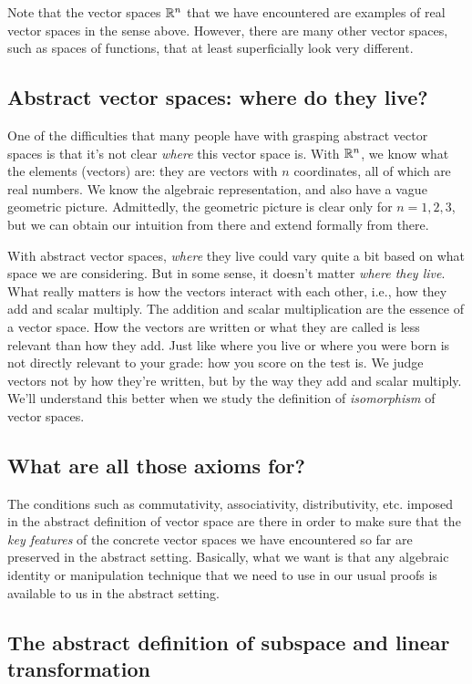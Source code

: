 \documentclass[10pt]{amsart}
\begin{document}
Note that the vector spaces $\mathbb{R}^n$ that we have encountered are
examples of real vector spaces in the sense above. However, there are
many other vector spaces, such as spaces of functions, that at least
superficially look very different.

\subsection{Abstract vector spaces: where do they live?}

One of the difficulties that many people have with grasping abstract
vector spaces is that it's not clear {\em where} this vector space
is. With $\mathbb{R}^n$, we know what the elements (vectors) are: they are
vectors with $n$ coordinates, all of which are real numbers. We know
the algebraic representation, and also have a vague geometric
picture. Admittedly, the geometric picture is clear only for $n =
1,2,3$, but we can obtain our intuition from there and extend formally
from there.

With abstract vector spaces, {\em where} they live could vary quite a
bit based on what space we are considering. But in some sense, it
doesn't matter {\em where they live}. What really matters is how the
vectors interact with each other, i.e., how they add and scalar
multiply. The addition and scalar multiplication are the essence of a
vector space. How the vectors are written or what they are called is
less relevant than how they add. Just like where you live or where you
were born is not directly relevant to your grade: how you score on the
test is. We judge vectors not by how they're written, but by the way
they add and scalar multiply. We'll understand this better when we
study the definition of {\em isomorphism} of vector spaces.

\subsection{What are all those axioms for?}

The conditions such as commutativity, associativity, distributivity,
etc. imposed in the abstract definition of vector space are there in
order to make sure that the {\em key features} of the concrete vector
spaces we have encountered so far are preserved in the abstract
setting. Basically, what we want is that any algebraic identity or
manipulation technique that we need to use in our usual proofs is
available to us in the abstract setting.
\subsection{The abstract definition of subspace and linear transformation}
\end{document}

